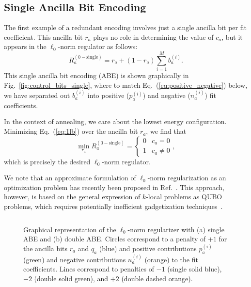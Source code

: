\documentclass[aps,prd,twocolumn, superscriptaddress,preprintnumbers, nofootinbib,longbibliography,floatfix]{revtex4-2}
\DeclareRobustCommand{\Fig}[1]{Fig.~\ref{#1}}
\DeclareRobustCommand{\Eq}[1]{Eq.~(\ref{#1})}
\DeclareRobustCommand{\Ref}[1]{Ref.~\cite{#1}}
\begin{document}
\subsection{Single Ancilla Bit Encoding}
\label{sec:singleABE}


The first example of a redundant encoding involves just a single ancilla bit per fit coefficient.
%
This ancilla bit $r_a$ plays no role in determining the value of $c_a$, but it appears in the $\ell_0$-norm regulator as follows: 
%
\begin{equation}
\label{eq:1lb}
R_a^{(0-\text{single})} = r_a + (1 - r_a) \sum_{i = 1}^M  b^{(i)}_a.
\end{equation}
%
This single ancilla bit encoding (ABE) is shown graphically in \Fig{fig:control_bits_single}, where to match \Eq{eq:positive_negative} below, we have separated out $b^{(i)}_a$ into positive ($p^{(i)}_a$) and negative ($n^{(i)}_a$) fit coefficients.

In the context of annealing, we care about the lowest energy configuration.
%
Minimizing \Eq{eq:1lb} over the ancilla bit $r_a$, we find that
%
\begin{equation}
\min_{r_a} R_a^{(0-\text{single})} = 
	\begin{cases}   
		0 & c_a = 0 \\
		1 & c_a \not= 0
	\end{cases},
	\label{eq:reg}
\end{equation}
%
which is precisely the desired $\ell_0$-norm regulator. 



We note that an approximate formulation of $\ell_0$-norm regularization as an optimization problem has recently been proposed in \Ref{desu2021adiabatic}.
%
This approach, however, is based on the general expression of $k$-local problems as QUBO problems, which requires potentially inefficient gadgetization techniques~\cite{dattani2019quadratization,abel,gabor}.

\begin{figure*}[t]
$\qquad$
%
\caption{Graphical representation of the $\ell_0$-norm regularizer with (a) single ABE and (b) double ABE.
%
Circles correspond to a penalty of $+1$ for the ancilla bits $r_a$ and $q_a$ (blue) and positive contributions $p_a^{(i)}$ (green) and negative contributions $n_a^{(i)}$ (orange) to the fit coefficients.
%
Lines correspond to penalties of $-1$ (single solid blue), $-2$ (double solid green), and $+2$ (double dashed orange).
}
\label{fig:control_bits}
\end{figure*}
\end{document}
